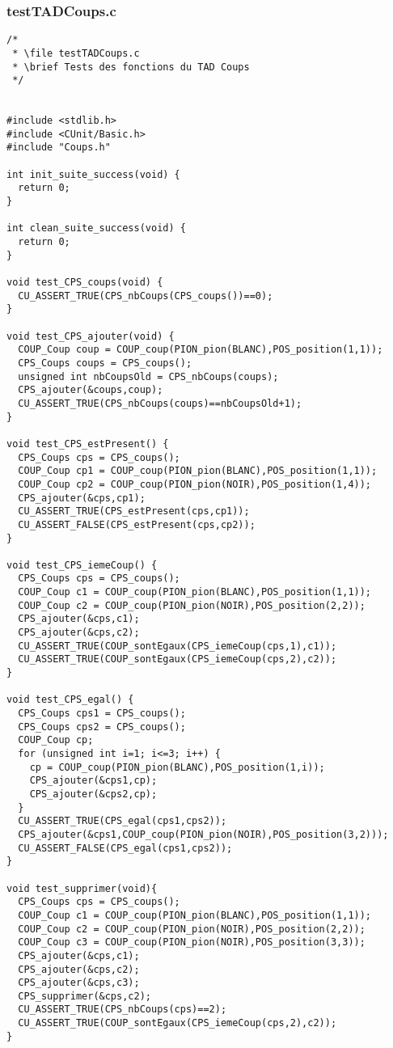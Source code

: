 \subsubsection{testTADCoups.c}
\begin{lstlisting}
/*
 * \file testTADCoups.c
 * \brief Tests des fonctions du TAD Coups
 */


#include <stdlib.h>
#include <CUnit/Basic.h>
#include "Coups.h"

int init_suite_success(void) {
  return 0;
}

int clean_suite_success(void) {
  return 0;
}

void test_CPS_coups(void) {
  CU_ASSERT_TRUE(CPS_nbCoups(CPS_coups())==0);
}

void test_CPS_ajouter(void) {
  COUP_Coup coup = COUP_coup(PION_pion(BLANC),POS_position(1,1));
  CPS_Coups coups = CPS_coups();
  unsigned int nbCoupsOld = CPS_nbCoups(coups);
  CPS_ajouter(&coups,coup);
  CU_ASSERT_TRUE(CPS_nbCoups(coups)==nbCoupsOld+1);
}

void test_CPS_estPresent() {
  CPS_Coups cps = CPS_coups();
  COUP_Coup cp1 = COUP_coup(PION_pion(BLANC),POS_position(1,1));
  COUP_Coup cp2 = COUP_coup(PION_pion(NOIR),POS_position(1,4));
  CPS_ajouter(&cps,cp1);
  CU_ASSERT_TRUE(CPS_estPresent(cps,cp1));
  CU_ASSERT_FALSE(CPS_estPresent(cps,cp2));
}

void test_CPS_iemeCoup() {
  CPS_Coups cps = CPS_coups();
  COUP_Coup c1 = COUP_coup(PION_pion(BLANC),POS_position(1,1));
  COUP_Coup c2 = COUP_coup(PION_pion(NOIR),POS_position(2,2));
  CPS_ajouter(&cps,c1);
  CPS_ajouter(&cps,c2);
  CU_ASSERT_TRUE(COUP_sontEgaux(CPS_iemeCoup(cps,1),c1));
  CU_ASSERT_TRUE(COUP_sontEgaux(CPS_iemeCoup(cps,2),c2));
}

void test_CPS_egal() {
  CPS_Coups cps1 = CPS_coups();
  CPS_Coups cps2 = CPS_coups();
  COUP_Coup cp;
  for (unsigned int i=1; i<=3; i++) {
    cp = COUP_coup(PION_pion(BLANC),POS_position(1,i));
    CPS_ajouter(&cps1,cp);
    CPS_ajouter(&cps2,cp);
  }
  CU_ASSERT_TRUE(CPS_egal(cps1,cps2));
  CPS_ajouter(&cps1,COUP_coup(PION_pion(NOIR),POS_position(3,2)));
  CU_ASSERT_FALSE(CPS_egal(cps1,cps2));
}

void test_supprimer(void){
  CPS_Coups cps = CPS_coups();
  COUP_Coup c1 = COUP_coup(PION_pion(BLANC),POS_position(1,1));
  COUP_Coup c2 = COUP_coup(PION_pion(NOIR),POS_position(2,2));
  COUP_Coup c3 = COUP_coup(PION_pion(NOIR),POS_position(3,3));
  CPS_ajouter(&cps,c1);
  CPS_ajouter(&cps,c2);
  CPS_ajouter(&cps,c3);
  CPS_supprimer(&cps,c2);
  CU_ASSERT_TRUE(CPS_nbCoups(cps)==2);
  CU_ASSERT_TRUE(COUP_sontEgaux(CPS_iemeCoup(cps,2),c2));
}


\end{lstlisting}
